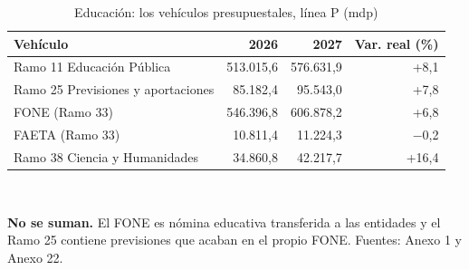 \begin{table}[htbp]\centering\small
\caption{Educación: los vehículos presupuestales, línea P (mdp)}\label{cua:educ}
\begin{tabular}{lrrr}
\toprule
Vehículo & 2026 & 2027 & Var. real (\%) \\
\midrule
Ramo 11 Educación Pública & 513.015,6 & 576.631,9 & +8,1 \\
Ramo 25 Previsiones y aportaciones & 85.182,4 & 95.543,0 & +7,8 \\
FONE (Ramo 33) & 546.396,8 & 606.878,2 & +6,8 \\
FAETA (Ramo 33) & 10.811,4 & 11.224,3 & $-$0,2 \\
Ramo 38 Ciencia y Humanidades & 34.860,8 & 42.217,7 & +16,4 \\
\bottomrule
\end{tabular}
\\[2pt]\begin{minipage}{0.92\textwidth}\scriptsize \textbf{No se suman.} El FONE es nómina educativa transferida a las entidades y el Ramo 25 contiene previsiones que acaban en el propio FONE. Fuentes: Anexo 1 y Anexo 22.\end{minipage}
\end{table}
